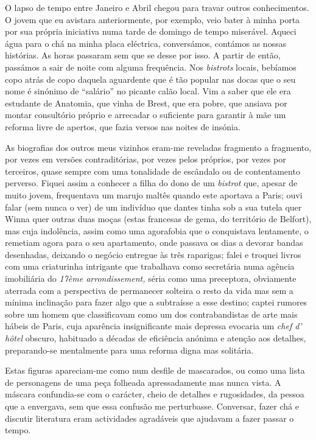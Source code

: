 O lapso de tempo entre Janeiro e Abril chegou para travar outros
conhecimentos. O jovem que eu avistara anteriormente, por exemplo,
veio bater à minha porta por sua própria iniciativa numa tarde de
domingo de tempo miserável. Aqueci água para o chá na minha placa
eléctrica, conversámos, contámos as nossas histórias. As horas passaram
sem que se desse por isso. A partir de então, passámos a sair de noite
com alguma frequência. Nos \emph{bistrots }locais, bebíamos copo atrás
de copo daquela aguardente que é tão popular nas docas que o seu nome é
sinónimo de ``salário'' no picante calão local. Vim a saber que ele era
estudante de Anatomia, que vinha de Brest, que era pobre, que ansiava
por montar consultório próprio e arrecadar o suficiente para garantir à
mãe um reforma livre de apertos, que fazia versos nas noites de insónia.

As biografias dos outros meus vizinhos eram-me reveladas fragmento a
fragmento, por vezes em versões contraditórias, por vezes pelos
próprios, por vezes por terceiros, quase sempre com uma tonalidade de
escândalo ou de contentamento perverso. Fiquei assim a conhecer a
filha do dono de um \emph{bistrot }que, apesar de muito jovem,
frequentava um marujo maltês quando este aportava a Paris; ouvi falar
(sem nunca o ver) de um indivíduo que dantes tinha sob a sua tutela quer
Winna quer outras duas moças (estas francesas de gema, do território de
Belfort), mas cuja indolência, assim como uma agorafobia que o
conquistava lentamente, o remetiam agora para o seu apartamento, onde
passava os dias a devorar bandas desenhadas, deixando o negócio
entregue às três raparigas; falei e troquei livros com uma criaturinha
intrigante que trabalhava como secretária numa agência imobiliária do \emph{17ème arrondissement, }séria como uma preceptora, obviamente aterrada com a
perspectiva de permanecer solteira o resto da vida mas sem a mínima
inclinação para fazer algo que a subtraísse a esse destino; captei
rumores sobre um homem que classificavam como um dos contrabandistas de
arte mais hábeis de Paris, cuja aparência insignificante mais depressa
evocaria um \emph{chef d' hôtel }obscuro, habituado a décadas de
eficiência anónima e atenção aos detalhes, preparando-se mentalmente
para uma reforma digna mas solitária.

Estas figuras apareciam-me como num desfile de mascarados, ou como uma
lista de personagens de uma peça folheada apressadamente mas nunca
vista. A máscara confundia-se com o carácter, cheio de detalhes e
rugosidades, da pessoa que a envergava, sem que essa confusão me
perturbasse. Conversar, fazer chá e discutir literatura eram
actividades agradáveis que ajudavam a fazer passar o tempo.


